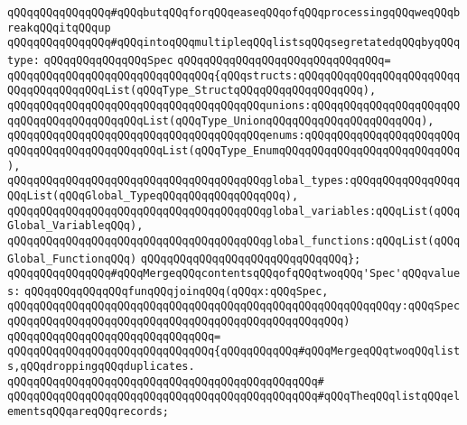 \verb|qQQqqQQqqQQqqQQq#qQQqbutqQQqforqQQqeaseqQQqofqQQqprocessingqQQqweqQQqbreakqQQqitqQQqup|\newline
\verb|qQQqqQQqqQQqqQQq#qQQqintoqQQqmultipleqQQqlistsqQQqsegretatedqQQqbyqQQqtype:|\newline
\newline
\verb|qQQqqQQqqQQqqQQqSpec|\newline
\verb|qQQqqQQqqQQqqQQqqQQqqQQqqQQqqQQq=|\newline
\verb|qQQqqQQqqQQqqQQqqQQqqQQqqQQqqQQq{qQQqstructs:qQQqqQQqqQQqqQQqqQQqqQQqqQQqqQQqqQQqqQQqList(qQQqType_StructqQQqqQQqqQQqqQQqqQQq),|\newline
\verb|qQQqqQQqqQQqqQQqqQQqqQQqqQQqqQQqqQQqqQQqunions:qQQqqQQqqQQqqQQqqQQqqQQqqQQqqQQqqQQqqQQqqQQqList(qQQqType_UnionqQQqqQQqqQQqqQQqqQQqqQQq),|\newline
\verb|qQQqqQQqqQQqqQQqqQQqqQQqqQQqqQQqqQQqqQQqenums:qQQqqQQqqQQqqQQqqQQqqQQqqQQqqQQqqQQqqQQqqQQqqQQqList(qQQqType_EnumqQQqqQQqqQQqqQQqqQQqqQQqqQQq),|\newline
\verb|qQQqqQQqqQQqqQQqqQQqqQQqqQQqqQQqqQQqqQQqglobal_types:qQQqqQQqqQQqqQQqqQQqList(qQQqGlobal_TypeqQQqqQQqqQQqqQQqqQQq),|\newline
\verb|qQQqqQQqqQQqqQQqqQQqqQQqqQQqqQQqqQQqqQQqglobal_variables:qQQqList(qQQqGlobal_VariableqQQq),|\newline
\verb|qQQqqQQqqQQqqQQqqQQqqQQqqQQqqQQqqQQqqQQqglobal_functions:qQQqList(qQQqGlobal_FunctionqQQq)|\newline
\verb|qQQqqQQqqQQqqQQqqQQqqQQqqQQqqQQq};|\newline
\newline
\verb|qQQqqQQqqQQqqQQq#qQQqMergeqQQqcontentsqQQqofqQQqtwoqQQq'Spec'qQQqvalues:|\newline
\verb|qQQqqQQqqQQqqQQqfunqQQqjoinqQQq(qQQqx:qQQqSpec,|\newline
\verb|qQQqqQQqqQQqqQQqqQQqqQQqqQQqqQQqqQQqqQQqqQQqqQQqqQQqqQQqqQQqy:qQQqSpec|\newline
\verb|qQQqqQQqqQQqqQQqqQQqqQQqqQQqqQQqqQQqqQQqqQQqqQQqqQQq)|\newline
\verb|qQQqqQQqqQQqqQQqqQQqqQQqqQQqqQQq=|\newline
\verb|qQQqqQQqqQQqqQQqqQQqqQQqqQQqqQQq{qQQqqQQqqQQq#qQQqMergeqQQqtwoqQQqlists,qQQqdroppingqQQqduplicates.|\newline
\verb|qQQqqQQqqQQqqQQqqQQqqQQqqQQqqQQqqQQqqQQqqQQqqQQq#|\newline
\verb|qQQqqQQqqQQqqQQqqQQqqQQqqQQqqQQqqQQqqQQqqQQqqQQq#qQQqTheqQQqlistqQQqelementsqQQqareqQQqrecords;|\newline

